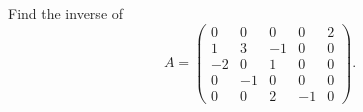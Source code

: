 \documentclass{ximera}
\begin{document}
\begin{exercise}

Find the inverse of 
\[A = \left(\begin{array}{ccccc}
0 & 0& 0& 0& 2\\
1 & 3& -1& 0& 0\\
-2 & 0& 1& 0& 0\\
0 & -1& 0& 0& 0\\
0 & 0& 2& -1& 0
\end{array}\right).
\]
\end{exercise}
\end{document}
